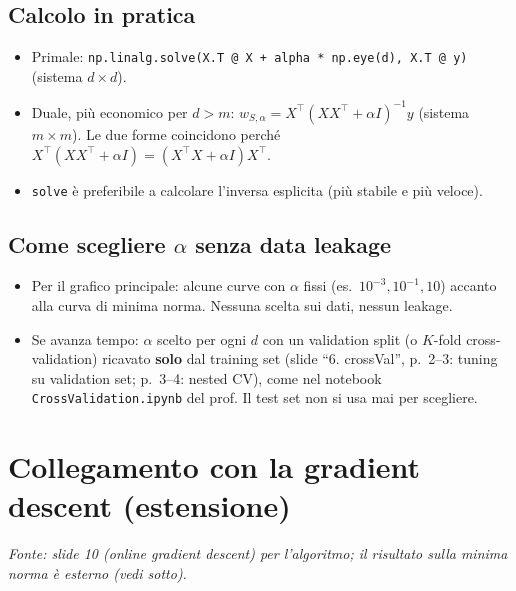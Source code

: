 \documentclass[11pt,a4paper]{article}
\newcommand{\fonte}[1]{\par\noindent\textit{Fonte: #1}\par\smallskip}
\begin{document}
\subsection{Calcolo in pratica}
\begin{itemize}
  \item Primale: \texttt{np.linalg.solve(X.T @ X + alpha * np.eye(d), X.T @ y)} (sistema $d \times d$).
  \item Duale, più economico per $d > m$: $w_{S,\alpha} = X^\top(XX^\top + \alpha I)^{-1}y$ (sistema $m\times m$).
        Le due forme coincidono perché $X^\top(XX^\top + \alpha I) = (X^\top X + \alpha I)X^\top$.
  \item \texttt{solve} è preferibile a calcolare l'inversa esplicita (più stabile e più veloce).
\end{itemize}

\subsection{Come scegliere $\alpha$ senza data leakage}
\begin{itemize}
  \item Per il grafico principale: alcune curve con $\alpha$ fissi (es.\ $10^{-3}, 10^{-1}, 10$) accanto alla curva
        di minima norma. Nessuna scelta sui dati, nessun leakage.
  \item Se avanza tempo: $\alpha$ scelto per ogni $d$ con un validation split (o $K$-fold cross-validation) ricavato
        \textbf{solo} dal training set (slide ``6. crossVal'', p.~2--3: tuning su validation set; p.~3--4: nested CV),
        come nel notebook \texttt{CrossValidation.ipynb} del prof.
        Il test set non si usa mai per scegliere.
\end{itemize}

\section{Collegamento con la gradient descent (estensione)}
\fonte{slide 10 (online gradient descent) per l'algoritmo; il risultato sulla minima norma è esterno (vedi sotto).}
\end{document}
